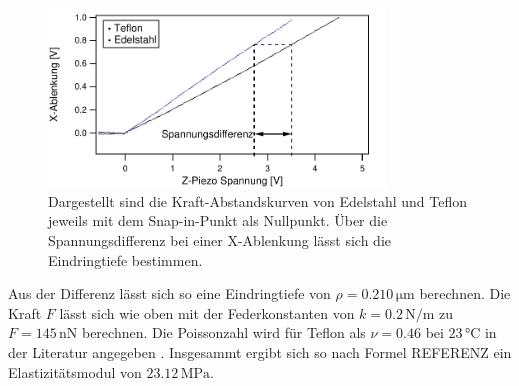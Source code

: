 \begin{figure}[H]
    \centering
    \includegraphics[width=0.8\textwidth]{bilder/Kraft_Abstand/Differenz.pdf}
    \caption{Dargestellt sind die Kraft-Abstandskurven von Edelstahl und Teflon jeweils mit dem Snap-in-Punkt als Nullpunkt. Über die Spannungsdifferenz bei einer X-Ablenkung lässt sich die Eindringtiefe bestimmen.}
    \label{fig:Differenz}
\end{figure}

Aus der Differenz lässt sich so eine Eindringtiefe von $\rho=0.210\,\si{\micro\meter}$ berechnen.
Die Kraft $F$ lässt sich wie oben mit der Federkonstanten von $k=0.2\,\si{\newton\per\meter}$ zu $F=145\,\si{\nano\newton}$ berechnen.
Die Poissonzahl wird für Teflon als $\nu=0.46$ bei $23\,\si{\celsius}$ in der Literatur angegeben \cite{P}.
Insgesammt ergibt sich so nach Formel REFERENZ ein Elastizitätsmodul von $23.12\,\si{\mega\pascal}$.
